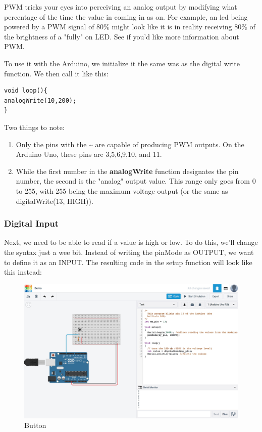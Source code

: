 \documentclass[a4paper]{article}
\begin{document}
PWM tricks your eyes into perceiving an analog output by modifying what percentage of the time the value in coming in as on. For example, an led being powered by a PWM signal of 80\% might look like it is in reality receiving 80\% of the brightness of a "fully" on LED. See \cite{ardunio_pwm} if you'd like more information about PWM.

To use it with the Arduino, we initialize it the same was as the digital write function. We then call it like this:
\begin{verbatim}
void loop(){
analogWrite(10,200);
}
\end{verbatim}
Two things to note:
\begin{enumerate}
\item Only the pins with the \~{} are capable of producing PWM outputs. On the Arduino Uno, these pins are 3,5,6,9,10, and 11.
\item While the first number in the \textbf{analogWrite} function designates the pin number, the second is the "analog" output value. This range only goes from 0 to 255, with 255 being the maximum voltage output (or the same as digitalWrite(13, HIGH)).
\end{enumerate}

\subsubsection{Digital Input}
Next, we need to be able to read if a value is high or low. To do this, we'll change the syntax just a wee bit. Instead of writing the pinMode as OUTPUT, we want to define it as an INPUT. The resulting code in the setup function will look like this instead:

\begin{figure}
\centering
\includegraphics[width=1\textwidth]{1-4.jpg}
\caption{\label{fig:button}Button}
\end{figure}
\end{document}
